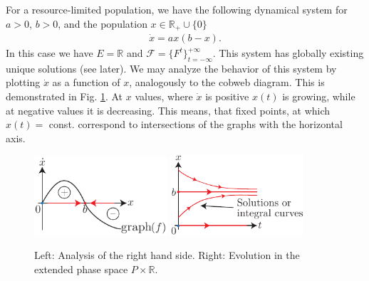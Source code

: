 \begin{ex}
	For a resource-limited population, we have the following dynamical system for $a> 0$, $b> 0$, and the population $x\in \mathbb{R}_+ \cup \{0\}$
	\begin{align}
		\dot{x} = ax(b-x).
	\end{align}
	In this case we have $E=\mathbb{R}$ and $\mathcal{F} = \{F^{t}\}_{t=-\infty }^{+\infty }$. This system has globally existing unique solutions (see later). We may analyze the behavior of this system by plotting $\dot{x}$ as a function of $x$, analogously to the cobweb diagram. This is demonstrated in Fig. \ref{fig:cds_analysis}. At $x$ values, where $\dot{x}$ is positive $x(t)$ is growing, while at negative values it is decreasing. This means, that fixed points, at which $x(t)=$ const. correspond to intersections of the graphs with the horizontal axis.
	\begin{figure}[h!]
		\centering
		\includegraphics[width=0.44\textwidth]{figures/intro/3RHS.pdf}	
		\hspace{0.05\textwidth}
		\includegraphics[width=0.44\textwidth]{figures/intro/4solutions.pdf}
		\caption{Left: Analysis of the right hand side. Right: Evolution in the extended phase space $P \times \mathbb{R}$.} \label{fig:cds_analysis}
	\end{figure}

\end{ex}

